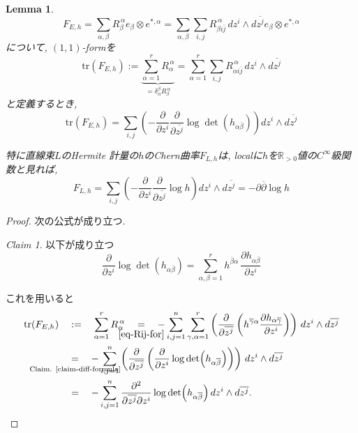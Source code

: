 \documentclass[dvipdfmx,a4paper,11pt]{article} %
\newtheorem{lem}[thm]{Lemma}
\theoremstyle{definition}
\theoremstyle{remark}
\newtheorem{claim}[thm]{Claim}
\numberwithin{equation}{section}
\newcommand{\underalign}[2]{\quad \underset{\mathclap{\strut #1}}{#2}\quad}
\newcommand{\R}{\mathbb{R}}
\begin{document}
\begin{lem}
\label{lem-trace-formula}
$$
F_{E,h}=
\sum_{\alpha,\beta}R_\beta^{\,\alpha}e_{\beta} \otimes e^{*,\alpha}
=\sum_{\alpha,\beta}\sum_{i,j} R_{\beta i\overline{j}}^{\,\alpha}\,dz^i\wedge d\overline{z^j} e_{\beta} \otimes e^{*, \alpha}
$$
について, $(1,1)$-formを
$$
\mathrm{tr}(F_{E,h})
:=
\underbrace{\sum_{\alpha=1}^{r}R_\alpha^{\,\alpha}}_{=\delta_{\alpha}^{\beta}R_\beta^{\,\alpha}}
=\sum_{\alpha=1}^{r}\sum_{i,j} 
R_{\alpha i\overline{j}}^{\,\alpha}\,dz^i\wedge d\overline{z^j} 
$$
と定義するとき, 
$$
\mathrm{tr}(F_{E,h})
=\sum_{i,j} 
\left( -\frac{\partial}{\partial z^i}\frac{\partial}{\partial \overline{z^j}}\log\det(h_{\alpha\overline{\beta}}) \right)dz^i\wedge d\overline{z^j} 
$$

特に直線束$L$のHermite 計量の$h$のChern曲率$F_{L,h}$は, localに$h$を$\R_{>0}$値の$C^\infty$級関数と見れば, 
$$
F_{L, h}=
\sum_{i,j} 
\left( -\frac{\partial}{\partial z^i}\frac{\partial}{\partial \overline{z^j}}\log h \right)dz^i\wedge d\overline{z^j} 
= -\partial \overline{\partial}\log h
$$
\end{lem}
\begin{proof}
次の公式が成り立つ. 
\begin{claim}
\label{claim-diff-formula}
以下が成り立つ
\[
\frac{\partial }{\partial z^i} 
\log\det(h_{\alpha\overline\beta})
=
\sum_{\alpha,\beta=1}^{r}
h^{\overline\beta\alpha}\,
\frac{\partial h_{\alpha\overline\beta}}{\partial z^i}
\]
\end{claim}

これを用いると
\begin{align*}
\mathrm{tr}(F_{E,h})
&\underalign{}{:=}
\sum_{\alpha=1}^{r}R_\alpha^{\,\alpha}
\underalign{\eqref{eq-Rij-for}}{=}
-
\sum_{i,j=1}^{n}
\sum_{\gamma, \alpha=1}^{r}
\left(
\frac{\partial}{\partial \overline{z^j}}
\left(
h^{\overline\gamma\alpha}
\frac{\partial h_{\alpha\overline\gamma}}{\partial z^i}
\right)
\right)
\,dz^i\wedge d\overline{z^j}
\\
&\underalign{\text{Claim. \ref{claim-diff-formula}}}{=}
-
\sum_{i,j=1}^{n}
\left(
\frac{\partial}{\partial \overline{z^j}}
\left(
\frac{\partial }{\partial z^i}
\log\det(h_{\alpha\overline\beta})
\right)
\right)
\,dz^i\wedge d\overline{z^j}
\\
&\underalign{}{=}
-
\sum_{i,j=1}^{n}
\frac{\partial^2}{\partial \overline{z^j}\partial z^i}
\log\det(h_{\alpha\overline\beta})
\,dz^i\wedge d\overline{z^j}.
\end{align*}
\end{proof}
\end{document}

